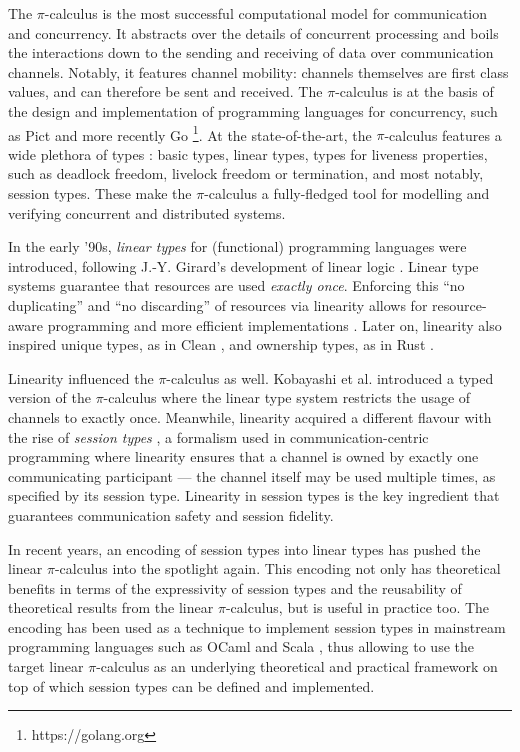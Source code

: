 \documentclass[sigplan,10pt,anonymous,review]{acmart}
\theoremstyle{definition}
\newcommand{\picalc}{$\pi$-calculus}
\begin{document}
The \picalc{} \cite{MilnerPW92,Milner99} is the most successful computational model for communication and concurrency.
It abstracts over the details of concurrent processing and boils the interactions down to the sending and receiving of data over communication channels.
Notably, it features channel mobility: channels themselves are first class values, and can therefore be sent and received.
The \picalc{} is at the basis of the design and implementation of programming languages for concurrency, such as Pict \cite{PierceT00} and more recently Go \footnote{https://golang.org}.
At the state-of-the-art, the \picalc{} features a wide plethora of types \cite{K07}: basic types, linear types, types for liveness properties, such as deadlock freedom, livelock freedom or termination, and most notably, session types.
These make the \picalc{} a fully-fledged tool for modelling and verifying concurrent and distributed systems.

In the early '90s, \emph{linear types} for (functional) programming languages \cite{Wadler90,Bernardy2018} were introduced, following J.-Y. Girard's development of linear logic \cite{Girard87}.
Linear type systems guarantee that resources are used \emph{exactly once}.
Enforcing this ``no duplicating'' and ``no discarding'' of resources via linearity allows for resource-aware programming and more efficient implementations \cite{Wadler90}.
Later on, linearity also inspired unique types, as in Clean \cite{BarendsenS96}, and ownership types, as in Rust \cite{MatsakisK14}.

Linearity influenced the $\pi$-calculus as well.
Kobayashi et al. \cite{KPT96} introduced a typed version of the \picalc{} where the linear type system restricts the usage of channels to exactly once.
%
Meanwhile, linearity acquired a different flavour with the rise of \emph{session types} \cite{H93,THK94,HVK98}, a formalism used in communication-centric programming where linearity ensures that a channel is owned by exactly one communicating participant --- the channel itself may be used multiple times, as specified by its session type.
Linearity in session types is the key ingredient that guarantees communication safety and session fidelity.

In recent years, an encoding of session types into linear types \cite{DardhaGS12,Dardha14,DardhaGS17} has pushed the linear \picalc{} \cite{KPT96} into the spotlight again.
This encoding not only has theoretical benefits in terms of the expressivity of session types and the reusability of theoretical results from the linear \picalc{}, but is useful in practice too.
The encoding has been used as a technique to implement session types in mainstream programming languages such as OCaml \cite{Padovani17} and Scala \cite{ScalasY16,ScalasDHY17}, thus allowing to use the target linear \picalc{} as an underlying theoretical and practical framework on top of which session types can be defined and implemented.
\end{document}
